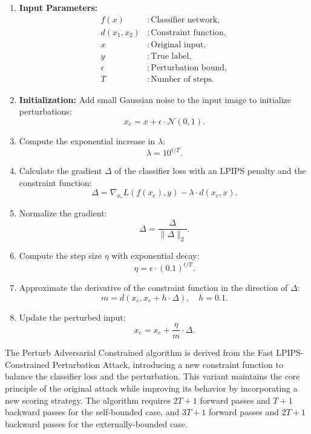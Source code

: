 \begin{enumerate}
    \item \textbf{Input Parameters:}  
    \begin{align*}
    f(x) &: \text{Classifier network}, \\
    d(x_1, x_2) &: \text{Constraint function}, \\
    x &: \text{Original input}, \\
    y &: \text{True label}, \\
    \epsilon &: \text{Perturbation bound}, \\
    T &: \text{Number of steps}.
    \end{align*}

    \item \textbf{Initialization:}  
    Add small Gaussian noise to the input image to initialize perturbations:
    \[
    x_e = x + \epsilon \cdot \mathcal{N}(0, 1).
    \]
    \item Compute the exponential increase in $\lambda$:
    \[
    \lambda = 10^{t/T}.
    \]
    \item Calculate the gradient $\Delta$ of the classifier loss with an LPIPS penalty and the constraint function:
    \[
    \Delta = \nabla_{x_e} L(f(x_e), y) - \lambda \cdot d(x_e, x).
    \]
    \item Normalize the gradient:
    \[
    \Delta = \frac{\Delta}{\|\Delta\|_2}.
    \]
    \item Compute the step size $\eta$ with exponential decay:
    \[
    \eta = \epsilon \cdot (0.1)^{t/T}.
    \]
    \item Approximate the derivative of the constraint function in the direction of $\Delta$:
    \[
    m = d(x_e, x_e + h \cdot \Delta), \quad h = 0.1.
    \]
    \item Update the perturbed input:
    \[
    x_e = x_e + \frac{\eta}{m} \cdot \Delta.
    \]
\end{enumerate}

The Perturb Adversarial Constrained algorithm is derived from the Fast LPIPS-Constrained Perturbation Attack, introducing a new constraint function to balance the classifier loss and the perturbation. This variant maintains the core principle of the original attack while improving its behavior by incorporating a new scoring strategy. The algorithm requires $2T + 1$ forward passes and $T + 1$ backward passes for the self-bounded case, and $3T + 1$ forward passes and $2T + 1$ backward passes for the externally-bounded case.